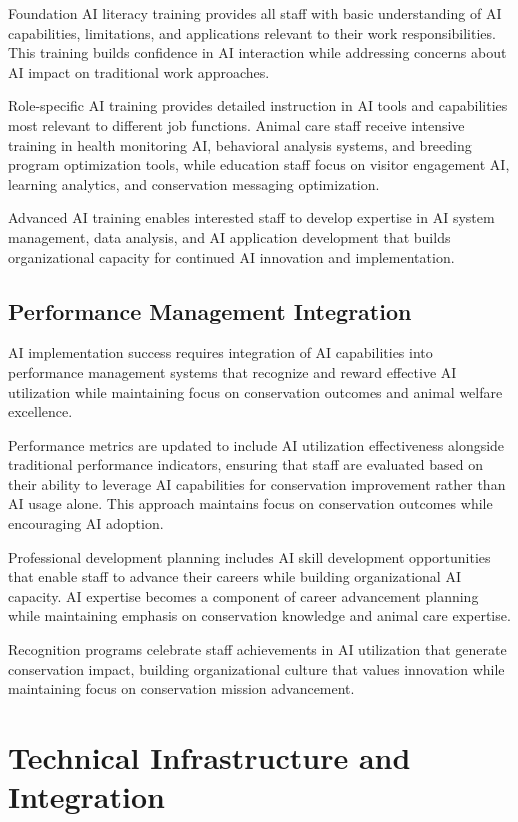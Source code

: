 \documentclass[
  Letterpaper,
]{scrbook}
\begin{document}
Foundation AI literacy training provides all staff with basic
understanding of AI capabilities, limitations, and applications relevant
to their work responsibilities. This training builds confidence in AI
interaction while addressing concerns about AI impact on traditional
work approaches.

Role-specific AI training provides detailed instruction in AI tools and
capabilities most relevant to different job functions. Animal care staff
receive intensive training in health monitoring AI, behavioral analysis
systems, and breeding program optimization tools, while education staff
focus on visitor engagement AI, learning analytics, and conservation
messaging optimization.

Advanced AI training enables interested staff to develop expertise in AI
system management, data analysis, and AI application development that
builds organizational capacity for continued AI innovation and
implementation.

\subsection{Performance Management
Integration}\label{performance-management-integration}

AI implementation success requires integration of AI capabilities into
performance management systems that recognize and reward effective AI
utilization while maintaining focus on conservation outcomes and animal
welfare excellence.

Performance metrics are updated to include AI utilization effectiveness
alongside traditional performance indicators, ensuring that staff are
evaluated based on their ability to leverage AI capabilities for
conservation improvement rather than AI usage alone. This approach
maintains focus on conservation outcomes while encouraging AI adoption.

Professional development planning includes AI skill development
opportunities that enable staff to advance their careers while building
organizational AI capacity. AI expertise becomes a component of career
advancement planning while maintaining emphasis on conservation
knowledge and animal care expertise.

Recognition programs celebrate staff achievements in AI utilization that
generate conservation impact, building organizational culture that
values innovation while maintaining focus on conservation mission
advancement.

\section{Technical Infrastructure and
Integration}\label{technical-infrastructure-and-integration}
\end{document}
